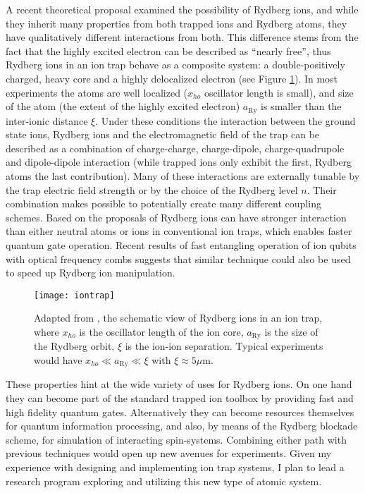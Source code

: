 A recent theoretical proposal \cite{Mueller2008} examined the possibility of Rydberg ions, and while they inherit many properties from both trapped ions and Rydberg atoms, they have qualitatively different interactions from both. This difference stems from the fact that the highly excited electron can be described as ``nearly free'', thus Rydberg ions in an ion trap behave as a composite system: a double-positively charged, heavy core and a highly delocalized electron (see Figure \ref{fig:iontrap}). In most experiments the atoms are well localized ($x_{ho}$ oscillator length is small), and size of the atom (the extent of the highly excited electron) $a_\mathrm{Ry}$ is smaller than the inter-ionic distance $\xi$. Under these conditions the interaction between the ground state ions, Rydberg ions and the electromagnetic field of the trap can be described as a combination of charge-charge, charge-dipole, charge-quadrupole and dipole-dipole interaction (while trapped ions only exhibit the first, Rydberg atoms the last contribution). Many of these interactions are externally tunable by the trap electric field strength or by the choice of the Rydberg level $n$. Their combination makes possible to potentially create many different coupling schemes. Based on the proposals of \cite{Mueller2008} Rydberg ions can have stronger interaction than either neutral atoms or ions in conventional ion traps, which enables faster quantum gate operation. Recent results of fast entangling operation of ion qubits with optical frequency combs \cite{Hayes2010} suggests that similar technique could also be used to speed up Rydberg ion manipulation.

\begin{figure}
  \begin{center}
    \texttt{[image: iontrap]}
    \caption{Adapted from \cite{Mueller2008}, the schematic view of Rydberg ions in an ion trap, where $x_{ho}$ is the oscillator length of the ion core, $a_\mathrm{Ry}$ is the size of the Rydberg orbit, $\xi$ is the ion-ion separation. Typical experiments would have $x_{ho} \ll a_\mathrm{Ry} \ll \xi$ with $\xi \approx 5 \mu\mathrm{m}$.}
  \end{center}
  \label{fig:iontrap}
\end{figure}

These properties hint at the wide variety of uses for Rydberg ions. On one hand they can become part of the standard trapped ion toolbox by providing fast and high fidelity quantum gates. Alternatively they can become resources themselves for quantum information processing, and also, by means of the Rydberg blockade scheme, for simulation of interacting spin-systems. Combining either path with previous techniques would open up new avenues for experiments. Given my experience with designing and implementing ion trap systems, I plan to lead a research program exploring and utilizing this new type of atomic system.


